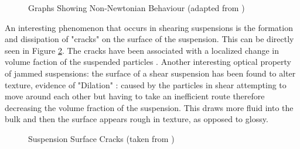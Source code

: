 \documentclass[a4]{report}
\begin{document}
	\begin{figure}[!htb]
		\centering
		\label{figshearthinthick}
		\caption{Graphs Showing Non-Newtonian Behaviour (adapted from \cite{figshearthin, figshearthick})}
	\end{figure} \newline  \noindent
	An interesting phenomenon that occurs in shearing suspensions is the formation and dissipation of "cracks" on the surface of the suspension. This can be directly seen in Figure \ref{cforscracks}. The cracks have been associated with a localized change in volume faction of the suspended particles \cite{backhawjam}. Another interesting optical property of jammed suspensions: the surface of a shear suspension has been found to alter texture, evidence of "Dilation" \cite{backbrownjaegrev}: caused by the particles in shear attempting to move around each other but having to take an inefficient route therefore decreasing the volume fraction of the suspension. This draws more fluid into the bulk and then the surface appears rough in texture, as opposed to glossy. 
\newline \newline \noindent
	\begin{figure}[!htb]
		\centering
		\caption{Suspension Surface Cracks (taken from \cite[p.~118]{thescforsyth})}
		\label{cforscracks}
	\end{figure} \newline  \noindent
	
\end{document}
